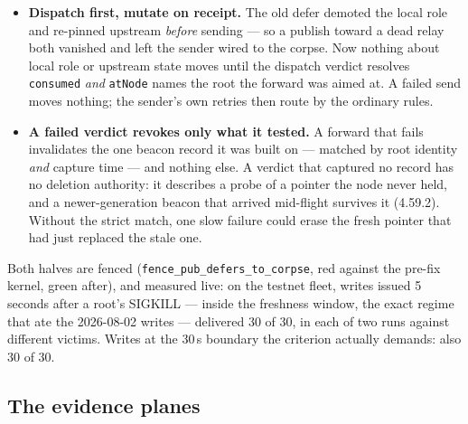 \documentclass[nobib]{tufte-handout}
\begin{document}
\begin{itemize}
\item \textbf{Dispatch first, mutate on receipt.} The old defer demoted
  the local role and re-pinned upstream \emph{before} sending --- so a
  publish toward a dead relay both vanished and left the sender wired
  to the corpse. Now nothing about local role or upstream state moves
  until the dispatch verdict resolves \texttt{consumed} \emph{and}
  \texttt{atNode} names the root the forward was aimed at. A failed
  send moves nothing; the sender's own retries then route by the
  ordinary rules.
\item \textbf{A failed verdict revokes only what it tested.} A forward
  that fails invalidates the one beacon record it was built on ---
  matched by root identity \emph{and} capture time --- and nothing
  else. A verdict that captured no record has no deletion authority: it
  describes a probe of a pointer the node never held, and a
  newer-generation beacon that arrived mid-flight survives it
  (4.59.2). Without the strict match, one slow failure could erase the
  fresh pointer that had just replaced the stale one.
\end{itemize}

Both halves are fenced (\texttt{fence\_pub\_defers\_to\_corpse}, red
against the pre-fix kernel, green after), and measured live: on the
testnet fleet, writes issued 5 seconds after a root's SIGKILL --- inside
the freshness window, the exact regime that ate the 2026-08-02 writes
--- delivered 30 of 30, in each of two runs against different victims.
Writes at the 30\,s boundary the criterion actually demands: also 30 of
30.

\subsection{The evidence planes}
\end{document}
